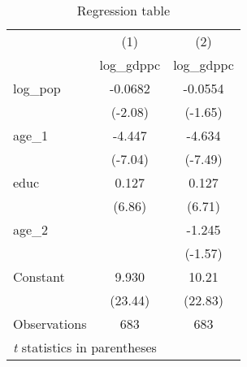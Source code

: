 \begin{table}[htbp]\centering
\caption{Regression table\label{tab1}}
\begin{tabular}{l*{2}{c}}
\hline\hline
                    &\multicolumn{1}{c}{(1)}&\multicolumn{1}{c}{(2)}\\
                    &\multicolumn{1}{c}{log\_gdppc}&\multicolumn{1}{c}{log\_gdppc}\\
\hline
log\_pop             &     -0.0682&     -0.0554\\
                    &     (-2.08)&     (-1.65)\\
[1em]
age\_1               &      -4.447&      -4.634\\
                    &     (-7.04)&     (-7.49)\\
[1em]
educ                &       0.127&       0.127\\
                    &      (6.86)&      (6.71)\\
[1em]
age\_2               &            &      -1.245\\
                    &            &     (-1.57)\\
[1em]
Constant            &       9.930&       10.21\\
                    &     (23.44)&     (22.83)\\
\hline
Observations        &         683&         683\\
\hline\hline
\multicolumn{3}{l}{\footnotesize \textit{t} statistics in parentheses}\\
\end{tabular}
\end{table}
